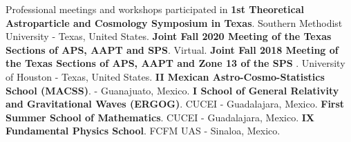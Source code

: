 \begin{rubric}{Professional meetings and workshops participated in}
\entry*[10/10/2022] \textbf{1st Theoretical Astroparticle and Cosmology Symposium in Texas}. Southern Methodist University - Texas, United States.
\entry*[12/11/2020] \textbf{Joint Fall 2020 Meeting of the Texas Sections of APS, AAPT and SPS}. Virtual.
\entry*[19/10/2018] \textbf{Joint Fall 2018 Meeting of the Texas Sections of APS, AAPT and Zone 13 of the SPS }. University of Houston - Texas, United States.
\entry*[08/05/2017] \textbf{II Mexican Astro-Cosmo-Statistics School (MACSS)}. - Guanajuato, Mexico.
\entry*[11/07/2016] \textbf{I School of General Relativity and Gravitational Waves (ERGOG)}. CUCEI - Guadalajara, Mexico.
\entry*[06/29/2015] \textbf{First Summer School of Mathematics}. CUCEI - Guadalajara, Mexico.
\entry*[08/09/2014] \textbf{IX Fundamental Physics School}. FCFM UAS - Sinaloa, Mexico.
\end{rubric}